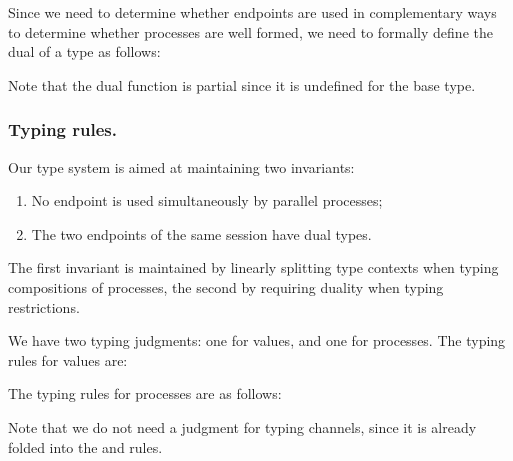 \documentclass[runningheads]{llncs}
\begin{document}
Since we need to determine whether endpoints are used in complementary ways to determine whether processes are well formed, we need to formally define the dual of a type as follows:
Note that the dual function is partial since it is undefined for the base type.

\subsubsection{Typing rules.}
Our type system is aimed at maintaining two invariants:
\begin{enumerate}
\item No endpoint is used simultaneously by parallel processes;
\item The two endpoints of the same session have dual types.
\end{enumerate}
The first invariant is maintained by linearly splitting type contexts when typing compositions of processes, the second by requiring duality when typing restrictions.

We have two typing judgments: one for values, and one for processes.
The typing rules for values are:
The typing rules for processes are as follows:
Note that we do not need a judgment for typing channels, since it is already folded into the  and  rules.
\end{document}
